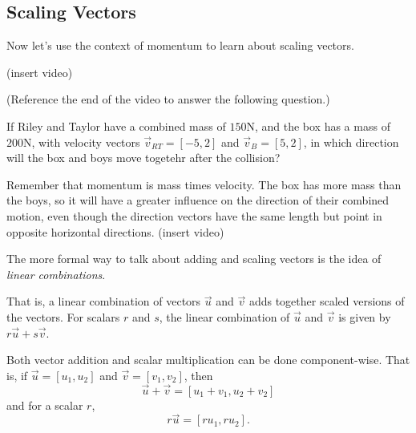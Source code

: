 \documentclass{ximera}
\begin{document}
\subsection*{Scaling Vectors}

Now let's use the context of momentum to learn about scaling vectors.

(insert video)

\begin{problem}
    (Reference the end of the video to answer the following question.)
    
    If Riley and Taylor have a combined mass of $150$N, and the box has a mass of $200$N, with velocity vectors $\vec{v}_{RT}=[-5,2]$ and $\vec{v}_B=[5,2]$, in which direction will the box and boys move togetehr after the collision?
    \begin{multipleChoice}
    \end{multipleChoice}
    \begin{feedback}
        Remember that momentum is mass times velocity. The box has more mass than the boys, so it will have a greater influence on the direction of their combined motion, even though the direction vectors have the same length but point in opposite horizontal directions.
        (insert video)
    \end{feedback}
\end{problem}

\begin{definition}
The more formal way to talk about adding and scaling vectors is the idea of \emph{linear combinations}. 

That is, a linear combination of vectors $\vec{u}$ and $\vec{v}$ adds together scaled versions of the vectors. For scalars $r$ and $s$, the linear combination of $\vec{u}$ and $\vec{v}$ is given by $r\vec{u}+s\vec{v}$.
\end{definition}

\begin{remark}
    Both vector addition and scalar multiplication can be done component-wise. That is, if $\vec{u}=[u_1,u_2]$ and $\vec{v}=[v_1,v_2]$, then
    \[\vec{u}+\vec{v}=[u_1+v_1,u_2+v_2]\]
    and for a scalar $r$,
    \[r\vec{u}=[ru_1,ru_2].\]
\end{remark}
\end{document}
